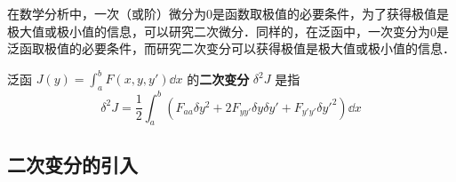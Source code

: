 
\begin{issues}
\issueTODO
\end{issues}

在数学分析中，一次（或阶）微分为0是函数取极值的必要条件，为了获得极值是极大值或极小值的信息，可以研究二次微分．同样的，在泛函中，一次变分为0是泛函取极值的必要条件，而研究二次变分可以获得极值是极大值或极小值的信息．

泛函 $J(y)=\int_a^bF(x,y,y')\dd x$ 的\textbf{二次变分} $\delta^2J$ 是指
\begin{equation}
\delta^2J=\frac{1}{2}\int_a^b(F_{aa}\delta y^2+2F_{yy'}\delta y\delta y'+F_{y'y'}\delta y'^2)\dd x
\end{equation}
\subsection{二次变分的引入}